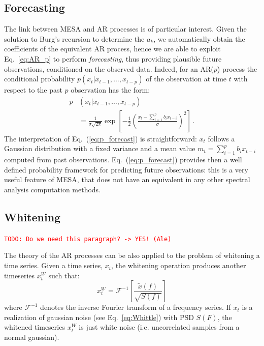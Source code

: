 \documentclass{aa}
\newcommand{\todo}[1]{{\textcolor{red}{\texttt{TODO: #1}} }}
\begin{document}
\subsection{Forecasting} \label{sec:forecasting}
The link between MESA and AR processes is of particular interest. Given the solution to Burg's recursion to determine the $a_k$, we automatically obtain the coefficients of the equivalent AR process, hence we are able to exploit Eq.~\ref{eq:AR_p} to perform \emph{forecasting}, thus providing plausible future observations, conditioned on the observed data.
Indeed, for an AR($p$) process the conditional probability $p(x_t|x_{t-1}, \ldots , x_{t-p})$ of the observation at time $t$ with respect to the past $p$ observation has the form:
\begin{align}\label{eq:p_forecast}
	p&(x_t|x_{t-1}, \ldots , x_{t-p}) \nonumber\\
	&= \frac{1}{\sigma\sqrt{2\pi}} \exp\left[-\frac{1}{2} \left(\frac{x_t - \sum_{i = 1}^p b_i x_{t-i}}{\sigma}\right)^2\right]\,.
\end{align}
The interpretation of Eq.~(\ref{eq:p_forecast}) is straightforward: $x_t$ follows a Gaussian distribution with a fixed variance and a mean value $m_t = \sum_{i = 1}^p b_i x_{t-i}$ computed from past observations.
Eq.~(\ref{eq:p_forecast}) provides then a well defined probability framework for predicting future observations: this is a very useful feature of MESA, that does not have an equivalent in any other spectral analysis computation methods.

\subsection{Whitening} \label{sec:whitening}
\todo{Do we need this paragraph? -> YES! (Ale)}

The theory of the AR processes can be also applied to the problem of whitening a time series.
Given a time series, $x_t$, the whitening operation produces another timeseries $x^W_t$ such that:
%
\begin{equation}\label{eq:whitening_definition}
	x^W_t = \mathcal{F}^{-1}\left[ \frac{\tilde{x}(f)}{\sqrt{S(f)}} \right]
\end{equation}
%
where $\mathcal{F}^{-1}$ denotes the inverse Fourier transform of a frequency series.
If $x_t$ is a realization of gaussian noise (see Eq.~\eqref{eq:Whittle}) with PSD $S(F)$, the whitened timeseries $x^W_t$ is just white noise (i.e. uncorrelated samples from a normal gaussian).
\end{document}
